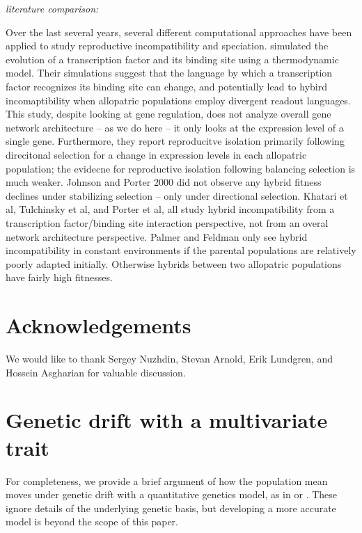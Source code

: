 \documentclass{article}
\newcommand{\jss}[1]{{\color{olive}\it #1}}
\newcommand{\1}{\mathbbm{1}}
\begin{document}
  \jss{literature comparison:}

  Over the last several years, several different computational approaches have been applied to study reproductive incompatibility and speciation. \citet{tulchinsky} simulated the evolution of a transcription factor and its binding site using a thermodynamic model. Their simulations suggest that the language by which a transcription factor recognizes its binding site can change, and potentially lead to hybird incomaptibility when allopatric populations employ divergent readout languages. This study, despite looking at gene regulation, does not analyze overall gene network architecture -- as we do here -- it only looks at the expression level of a single gene. Furthermore, they report reproducitve isolation primarily following direcitonal selection for a change in expression levels in each allopatric population; the evidecne for reproductive isolation following balancing selection is much weaker. Johnson and Porter 2000 did not observe any hybrid fitness declines under stabilizing selection -- only under directional selection. 
  Khatari et al, Tulchinsky et al, and Porter et al, all study hybrid incompatibility from a transcription factor/binding site interaction perspective, not from an overal network architecture perspective. Palmer and Feldman only see hybrid incompatibility in constant environments if the parental populations are relatively poorly adapted initially. Otherwise hybrids between two allopatric populations have fairly high fitnesses.  

\section*{Acknowledgements}
We would like to thank Sergey Nuzhdin, Stevan Arnold, Erik Lundgren, and Hossein Asgharian for valuable discussion.




\normalsize
\appendix

\section{Genetic drift with a multivariate trait}
\label{ss:quant_gen}

For completeness, we provide a brief argument of how the population mean
moves under genetic drift
with a quantitative genetics model,
as in \citet{lande1981models} or \citet{hansen1996translating}.
These ignore details of the underlying genetic basis,
but developing a more accurate model is beyond the scope of this paper.
\end{document}
